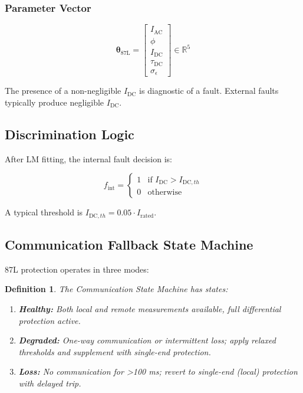 \documentclass[12pt,a4paper]{article}
\newtheorem{definition}{Definition}[section]
\newcommand{\thetaL}{\boldsymbol{\theta}_{\text{87L}}}
\begin{document}
\subsubsection{Parameter Vector}

\begin{equation}
\thetaL = \begin{bmatrix} I_{\text{AC}} \\ \phi \\ I_{\text{DC}} \\ \tau_{\text{DC}} \\ \sigma_{\epsilon} \end{bmatrix} \in \mathbb{R}^{5}
\label{eq:87l_theta}
\end{equation}

The presence of a non-negligible $I_{\text{DC}}$ is diagnostic of a fault. External faults 
typically produce negligible $I_{\text{DC}}$.

\subsection{Discrimination Logic}
\label{subsec:87l_logic}

After LM fitting, the internal fault decision is:

\begin{equation}
f_{\text{int}} = \begin{cases}
1 & \text{if } I_{\text{DC}} > I_{\text{DC},th} \\
0 & \text{otherwise}
\end{cases}
\label{eq:87l_fint}
\end{equation}

A typical threshold is $I_{\text{DC},th} = 0.05 \cdot I_{\text{rated}}$.

\subsection{Communication Fallback State Machine}
\label{subsec:87l_fsm}

87L protection operates in three modes:

\begin{definition}
The \textit{Communication State Machine} has states:
\begin{enumerate}
    \item \textbf{Healthy:} Both local and remote measurements available, full 
    differential protection active.
    
    \item \textbf{Degraded:} One-way communication or intermittent loss; apply 
    relaxed thresholds and supplement with single-end protection.
    
    \item \textbf{Loss:} No communication for >100 ms; revert to single-end (local) 
    protection with delayed trip.
\end{enumerate}
\end{definition}
\end{document}
